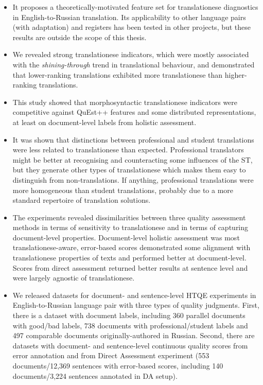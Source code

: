 \begin{itemize}\compresslist{}	
	\item It proposes a theoretically-motivated feature set for translationese diagnostics in English-to-Russian translation. Its applicability to other language pairs (with adaptation) and registers has been tested in other projects, but these results are outside the scope of this thesis.
	
	\item We revealed strong translationese indicators, which were mostly associated with the \textit{shining-through} trend in translational behaviour, and demonstrated that lower-ranking translations exhibited more translationese than higher-ranking translations.  
	
	\item This study showed that morphosyntactic translationese indicators were competitive against QuEst++ features and some distributed representations, at least on document-level labels from holistic assessment. 
	
	\item It was shown that distinctions between professional and student translations were less related to translationese than expected. Professional translators might be better at recognising and counteracting some influences of the ST, but they generate other types of translationese which makes them easy to distinguish from non-translations. If anything, professional translations were more homogeneous than student translations, probably due to a more standard repertoire of translation solutions. 
	
	\item The experiments revealed dissimilarities between three quality assessment methods in terms of sensitivity to translationese and in terms of capturing document-level properties. Document-level holistic assessment was most translationese-aware, error-based scores demonstrated some alignment with translationese properties of texts and performed better at document-level. Scores from direct assessment returned better results at sentence level and were largely agnostic of translationese. 
	
	\item We released datasets for document- and sentence-level \gls{HTQE} experiments in English-to-Russian language pair with three types of quality judgments. First, there is a dataset with document labels, including 360 parallel documents with good/bad labels, 738 documents with professional/student labels and 497 comparable documents originally-authored in Russian. Second, there are datasets with document- and sentence-level continuous quality scores from error annotation and from Direct Assessment experiment (553 documents/12,369 sentences with error-based scores, including 140 documents/3,224 sentences annotated in DA setup).

\end{itemize}

